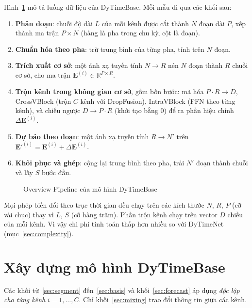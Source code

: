 \documentclass[12pt,a4paper]{report}
\numberwithin{equation}{chapter}
\newcommand{\R}{\mathbb{R}}
\begin{document}
Hình~\ref{fig:dytimebase} mô tả luồng dữ liệu của DyTimeBase. Mỗi mẫu đi qua các khối sau:
\begin{enumerate}
  \item \textbf{Phân đoạn}: chuỗi độ dài $L$ của mỗi kênh được cắt thành $N$ đoạn dài $P$, xếp thành ma trận
        $P\times N$ (hàng là pha trong chu kỳ, cột là đoạn).
  \item \textbf{Chuẩn hóa theo pha}: trừ trung bình của từng pha, tính trên $N$ đoạn.
  \item \textbf{Trích xuất cơ sở}: một ánh xạ tuyến tính $N\to R$ nén $N$ đoạn thành $R$ chuỗi cơ sở,
        cho ma trận $\mathbf{E}^{(i)}\in\R^{P\times R}$.
  \item \textbf{Trộn kênh trong không gian cơ sở}, gồm bốn bước:
        mã hóa $P\cdot R\to D$, CrossVBlock (trộn $C$ kênh với DropFusion), IntraVBlock (FFN theo từng kênh), và chiếu
        ngược $D\to P\cdot R$ (khởi tạo bằng 0) để ra phần hiệu chỉnh $\Delta\mathbf{E}^{(i)}$.
  \item \textbf{Dự báo theo đoạn}: một ánh xạ tuyến tính $R\to N'$ trên
        $\mathbf{E}'^{(i)}=\mathbf{E}^{(i)}+\Delta\mathbf{E}^{(i)}$.
  \item \textbf{Khôi phục và ghép}: cộng lại trung bình theo pha, trải $N'$ đoạn thành chuỗi và lấy $S$ bước đầu.
\end{enumerate}

\begin{figure}[ht]
  \centering
  \caption{Overview Pipeline của mô hình DyTimeBase}
  \label{fig:dytimebase}
\end{figure}

Mọi phép biến đổi theo trục thời gian đều chạy trên các kích thước $N$, $R$, $P$ (cỡ vài chục) thay vì $L$, $S$
(cỡ hàng trăm). Phần trộn kênh chạy trên vector $D$ chiều của mỗi kênh. Vì vậy chi phí tính toán thấp hơn nhiều
so với DyTimeNet (mục~\ref{sec:complexity}).

\section{Xây dựng mô hình DyTimeBase}

Các khối từ~\ref{sec:segment} đến~\ref{sec:basis} và khối~\ref{sec:forecast} áp dụng \emph{độc lập cho từng kênh}
$i=1,\dots,C$. Chỉ khối~\ref{sec:mixing} trao đổi thông tin giữa các kênh.
\end{document}
